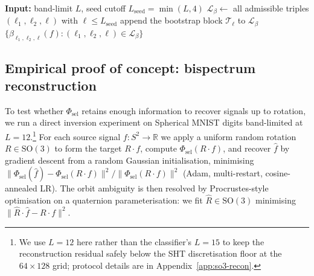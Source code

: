\documentclass{article}
\theoremstyle{definition}
\theoremstyle{remark}
\newcommand{\R}{\mathbb{R}}
\newcommand{\SO}{\mathrm{SO}}
\theoremstyle{definition}
\begin{document}
\begin{algorithm}[H]
\caption{Selected bispectral triples $\mathcal{S}_\beta$ for the
  augmented $\SO(3)$ invariant (BFS form; mirrors~\citet{mataigne2024selective},
  Alg.~1). The full index set --- bispectral triples, mandatory
  self-couplings, and CG-power scalars --- is
  Algorithm~\ref{alg:so3-augmented} in Appendix~\ref{sec:app-selective-index}.}
\label{alg:selective-bsp-so3}
\small
\begin{algorithmic}[1]
\STATE \textbf{Input:} band-limit $L$,
  seed cutoff $L_{\mathrm{seed}} = \min(L,4)$
\STATE $\mathcal{L}_\beta \leftarrow$ all admissible triples
  $(\ell_1,\ell_2,\ell)$ with $\ell\le L_{\mathrm{seed}}$
  \STATE append the bootstrap block $\mathcal{T}_\ell$
    to $\mathcal{L}_\beta$
\ENDFOR
\RETURN $\{\beta_{\ell_1,\ell_2,\ell}(f) :
  (\ell_1,\ell_2,\ell)\in\mathcal{L}_\beta\}$
\end{algorithmic}
\end{algorithm}

\subsection{Empirical proof of concept: bispectrum reconstruction}
\label{sec:so3-recon}

To test whether $\Phi_{\mathrm{sel}}$ retains enough information to
recover signals up to rotation, we run a direct inversion experiment
on Spherical MNIST digits band-limited at $L = 12$.\footnote{We use
$L{=}12$ here rather than the classifier's $L{=}15$ to keep the
reconstruction residual safely below the SHT discretisation floor at
the $64{\times}128$ grid; protocol details are in
Appendix~\ref{app:so3-recon}.} For each source signal
$f:S^2\to\R$ we apply a uniform random rotation $R\in\SO(3)$ to form
the target $R\cdot f$, compute $\Phi_{\mathrm{sel}}(R\cdot f)$, and
recover $\hat f$ by gradient descent from a random Gaussian
initialisation, minimising
$\lVert \Phi_{\mathrm{sel}}(\hat f) -
\Phi_{\mathrm{sel}}(R\cdot f)\rVert^2 / \lVert
\Phi_{\mathrm{sel}}(R\cdot f)\rVert^2$ (Adam,
multi-restart, cosine-annealed LR). The orbit ambiguity is then
resolved by Procrustes-style optimisation on a quaternion
parameterisation: we fit $\hat R\in\SO(3)$ minimising $\lVert
\hat R\cdot\hat f - R\cdot f\rVert^2$.
\end{document}
